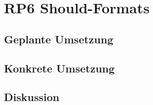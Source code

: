 \section{RP6 Should-Formats}
\label{sec:principle-rp6-should-formats}

\subsection*{Geplante Umsetzung}


\subsection*{Konkrete Umsetzung}


\subsection*{Diskussion}
